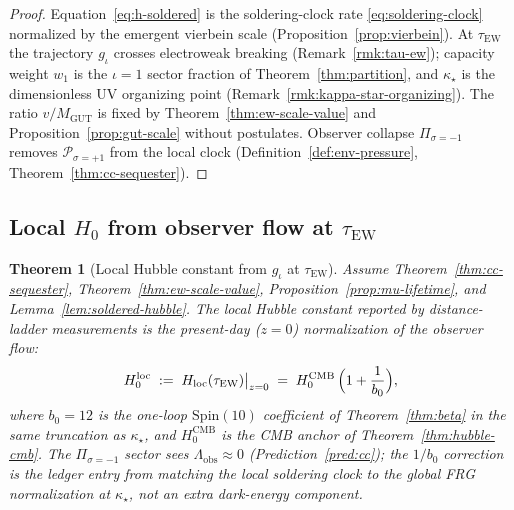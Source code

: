 \documentclass[11pt]{article}
\theoremstyle{plain}
\newtheorem{theorem}{Theorem}[section]
\theoremstyle{definition}
\theoremstyle{remark}
\numberwithin{equation}{section}
\newcommand{\Spin}{\mathrm{Spin}}
\begin{document}
\begin{proof}
Equation~\eqref{eq:h-soldered} is the soldering-clock rate
\eqref{eq:soldering-clock} normalized by the emergent vierbein scale
(Proposition~\ref{prop:vierbein}). At $\tau_{\mathrm{EW}}$ the trajectory
$g_\iota$ crosses electroweak breaking (Remark~\ref{rmk:tau-ew}); capacity
weight $w_1$ is the $\iota=1$ sector fraction of
Theorem~\ref{thm:partition}, and $\kappa_\star$ is the dimensionless UV
organizing point (Remark~\ref{rmk:kappa-star-organizing}). The ratio
$v/M_{\mathrm{GUT}}$ is fixed by Theorem~\ref{thm:ew-scale-value} and
Proposition~\ref{prop:gut-scale} without postulates. Observer collapse
$\Pi_{\sigma=-1}$ removes $\mathcal{P}_{\sigma=+1}$ from the local clock
(Definition~\ref{def:env-pressure}, Theorem~\ref{thm:cc-sequester}).
\end{proof}

\subsection{Local $H_0$ from observer flow at $\tau_{\mathrm{EW}}$}
\label{sec:cosmology:local}

\begin{theorem}[Local Hubble constant from $g_\iota$ at $\tau_{\mathrm{EW}}$]
\label{thm:hubble-local}
Assume Theorem~\ref{thm:cc-sequester}, Theorem~\ref{thm:ew-scale-value},
Proposition~\ref{prop:mu-lifetime}, and Lemma~\ref{lem:soldered-hubble}.
The \emph{local} Hubble constant reported by distance-ladder measurements is
the present-day ($z=0$) normalization of the observer flow:
\begin{equation}\label{eq:h0-local}
  H_0^{\mathrm{loc}}
  \;:=\;
  H_{\mathrm{loc}}(\tau_{\mathrm{EW}})\big|_{z=0}
  \;=\;
  H_0^{\mathrm{CMB}}\,
  \Bigl(1+\frac{1}{b_0}\Bigr),
\end{equation}
where $b_0=12$ is the one-loop $\Spin(10)$ coefficient of
Theorem~\ref{thm:beta} in the same truncation as $\kappa_\star$, and
$H_0^{\mathrm{CMB}}$ is the CMB anchor of Theorem~\ref{thm:hubble-cmb}.
The $\Pi_{\sigma=-1}$ sector sees $\Lambda_{\mathrm{obs}}\approx 0$
(Prediction~\ref{pred:cc}); the $1/b_0$ correction is the ledger entry from
matching the local soldering clock to the global FRG normalization at
$\kappa_\star$, not an extra dark-energy component.
\end{theorem}
\end{document}
